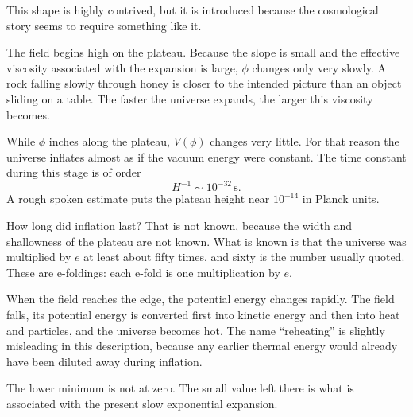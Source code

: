 This shape is highly contrived, but it is introduced because the cosmological story seems to require something like it.

The field begins high on the plateau. Because the slope is small and the effective viscosity associated with the expansion is large, \(\phi\) changes only very slowly. A rock falling slowly through honey is closer to the intended picture than an object sliding on a table. The faster the universe expands, the larger this viscosity becomes.

\begin{classroomqa}
\end{classroomqa}

While \(\phi\) inches along the plateau, \(V(\phi)\) changes very little. For that reason the universe inflates almost as if the vacuum energy were constant. The time constant during this stage is of order
\begin{equation}
H^{-1}\sim 10^{-32}\,\mathrm{s}.
\end{equation}
A rough spoken estimate puts the plateau height near \(10^{-14}\) in Planck units.

How long did inflation last? That is not known, because the width and shallowness of the plateau are not known. What is known is that the universe was multiplied by \(e\) at least about fifty times, and sixty is the number usually quoted. These are e-foldings: each e-fold is one multiplication by \(e\).

When the field reaches the edge, the potential energy changes rapidly. The field falls, its potential energy is converted first into kinetic energy and then into heat and particles, and the universe becomes hot. The name ``reheating'' is slightly misleading in this description, because any earlier thermal energy would already have been diluted away during inflation.

The lower minimum is not at zero. The small value left there is what is associated with the present slow exponential expansion.

\begin{classroomqa}
\end{classroomqa}

